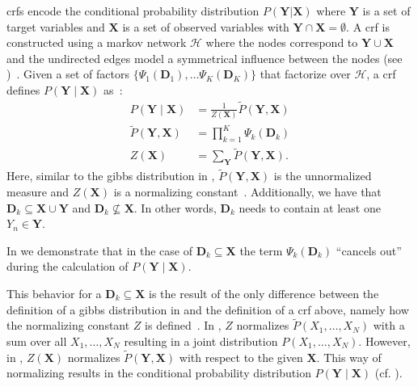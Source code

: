 \Glspl{crf} encode the \gls{conditional probability distribution} $P(\mathbf{Y}|\mathbf{X})$ where $\mathbf{Y}$ is a set of \glspl{target variable} and $\mathbf{X}$ is a set of \glspl{observed variable} with $\mathbf{Y}\cap\mathbf{X}=\emptyset$.
A \gls{crf} is constructed using a \gls{markov network} $\mathcal{H}$ where the nodes correspond to $\mathbf{Y}\cup\mathbf{X}$ and the undirected edges model a symmetrical influence between the nodes (see )~\citep{koller2009probabilistic}.
Given a set of \glspl{factor} $\{\Psi_1(\mathbf{D}_1),\dots\Psi_K(\mathbf{D}_K)\}$ that factorize over $\mathcal{H}$, a \gls{crf} defines $P(\mathbf{Y}\mid\mathbf{X})$ as~\citep{koller2009probabilistic}:
\begin{equation}
  \label{equ:crf-factor}
  \begin{split}
    P(\mathbf{Y}\mid\mathbf{X}) & = \frac{1}{Z(\mathbf{X})}\tilde{P}(\mathbf{Y},\mathbf{X}) \\
    \tilde{P}(\mathbf{Y},\mathbf{X}) &= \prod_{k=1}^{K}\Psi_k\left(\mathbf{D}_k\right) \\
    Z(\mathbf{X}) & = \sum_{\mathbf{Y}}\tilde{P}(\mathbf{Y},\mathbf{X}).
  \end{split}
\end{equation}
Here, similar to the \gls{gibbs distribution} in , $\tilde{P}(\mathbf{Y},\mathbf{X})$ is the unnormalized measure and $Z(\mathbf{X})$ is a \gls{normalizing constant}~\citep{koller2009probabilistic}.
Additionally, we have that $\mathbf{D}_k\subseteq\mathbf{X}\cup\mathbf{Y}$ and $\mathbf{D}_k\not\subseteq\mathbf{X}$.
In other words, $\mathbf{D}_k$ needs to contain at least one $Y_n\in \mathbf{Y}$.

In  we demonstrate that in the case of $\mathbf{D}_k\subseteq \mathbf{X}$ the term $\Psi_k(\mathbf{D}_k)$ ``cancels out'' during the calculation of $P(\mathbf{Y}\mid\mathbf{X})$.

This behavior for a $\mathbf{D}_k\subseteq\mathbf{X}$ is the result of the only difference between the definition of a \gls{gibbs distribution} in  and the definition of a \gls{crf} above, namely how the \gls{normalizing constant} $Z$ is defined~\citep{koller2009probabilistic}.
In , $Z$ normalizes $\tilde{P}(X_1,\dots,X_N)$ with a sum over all $X_1,\dots,X_N$ resulting in a \gls{joint distribution} $P(X_1,\dots,X_N)$.
However, in , $Z(\mathbf{X})$ normalizes $\tilde{P}(\mathbf{Y},\mathbf{X})$ with respect to the given $\mathbf{X}$.
This way of normalizing results in the \gls{conditional probability distribution} $P(\mathbf{Y}\mid\mathbf{X})$ (cf. ).

